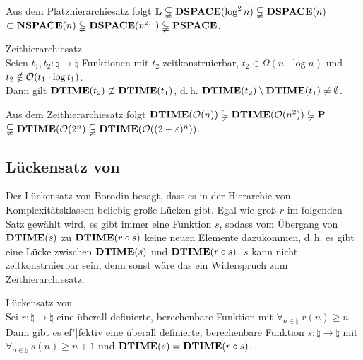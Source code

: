 \begin{Kor}
    Aus dem Platzhierarchiesatz folgt
    $\mathbf{L} \subsetneqq \mathbf{DSPACE}(\log^2 n) \subsetneqq \mathbf{DSPACE}(n)$\\
    $\subset \mathbf{NSPACE}(n) \subsetneqq \mathbf{DSPACE}(n^{2.1}) \subsetneqq \mathbf{PSPACE}$.
\end{Kor}

\linie

\begin{Satz}{Zeithierarchiesatz}\\
    Seien $t_1, t_2\colon \natural \rightarrow \natural$ Funktionen mit
    $t_2$ zeitkonstruierbar, $t_2 \in \Omega(n \cdot \log n)$ und
    $t_2 \notin \mathcal{O}(t_1 \cdot \log t_1)$.\\
    Dann gilt $\mathbf{DTIME}(t_2) \not\subset \mathbf{DTIME}(t_1)$, d.\,h.
    $\mathbf{DTIME}(t_2) \setminus \mathbf{DTIME}(t_1) \not= \emptyset$.
\end{Satz}

\begin{Kor}
    Aus dem Zeithierarchiesatz folgt
    $\mathbf{DTIME}(\mathcal{O}(n)) \subsetneqq \mathbf{DTIME}(\mathcal{O}(n^2)) \subsetneqq \mathbf{P}$\\
    $\subsetneqq \mathbf{DTIME}(\mathcal{O}(2^n) \subsetneqq \mathbf{DTIME}(\mathcal{O}((2 + \varepsilon)^n))$.
\end{Kor}

\pagebreak

\subsection{%
    Lückensatz von %
}

\begin{Bem}
    Der Lückensatz von Borodin besagt, dass es in der Hierarchie von Komplexitätsklassen
    beliebig große Lücken gibt.
    Egal wie groß $r$ im folgenden Satz gewählt wird, es gibt immer eine Funktion $s$,
    sodass vom Übergang von $\mathbf{DTIME}(s)$ zu $\mathbf{DTIME}(r \circ s)$ keine neuen Elemente dazukommen,
    d.\,h. es gibt eine Lücke zwischen $\mathbf{DTIME}(s)$ und $\mathbf{DTIME}(r \circ s)$.
    $s$ kann nicht zeitkonstruierbar sein, denn sonst wäre das ein Widerspruch
    zum Zeithierarchiesatz.
\end{Bem}

\linie

\begin{Satz}{Lückensatz von \upshape\,\!}\\
    Sei $r\colon \natural \rightarrow \natural$ eine überall definierte, berechenbare Funktion mit
    $\forall_{n \in \natural}\; r(n) \ge n$.\\
    Dann gibt es ef"|fektiv eine überall definierte, berechenbare Funktion
    $s\colon \natural \rightarrow \natural$ mit\\
    $\forall_{n \in \natural}\; s(n) \ge n + 1$ und $\mathbf{DTIME}(s) = \mathbf{DTIME}(r \circ s)$.
\end{Satz}

